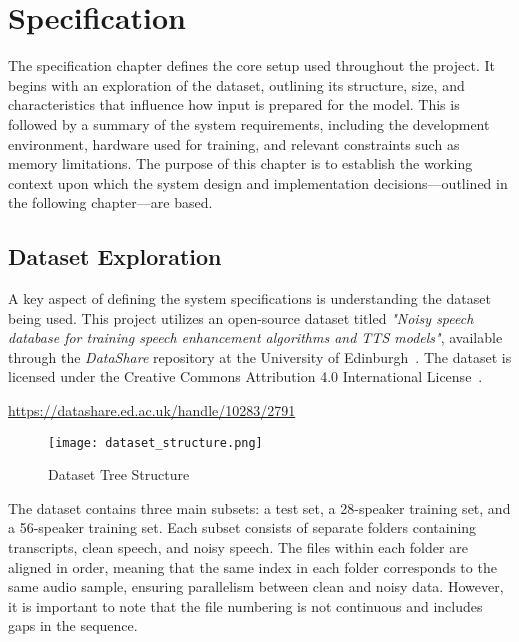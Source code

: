 \graphicspath{{content/chapters/4_specification/figures/}}
\chapter{Specification}
\label{chp:specification}

The specification chapter defines the core setup used throughout the project. It begins with an exploration of the dataset, outlining its structure, size, and characteristics that influence how input is prepared for the model. This is followed by a summary of the system requirements, including the development environment, hardware used for training, and relevant constraints such as memory limitations. The purpose of this chapter is to establish the working context upon which the system design and implementation decisions—outlined in the following chapter—are based.

\section{Dataset Exploration}
\label{sec:dataset_exploration}

A key aspect of defining the system specifications is understanding the dataset being used. This project utilizes an open-source dataset titled \textit{"Noisy speech database for training speech enhancement algorithms and TTS models"}, available through the \textit{DataShare} repository at the University of Edinburgh~\cite{edinburghdataset}. The dataset is licensed under the Creative Commons Attribution 4.0 International License~\cite{ccby4}.

\url{https://datashare.ed.ac.uk/handle/10283/2791}

\begin{figure}[H]
    \centering
    \texttt{[image: dataset\_structure.png]}
    \caption{Dataset Tree Structure}
    \label{fig:dataset_structure}
\end{figure}

The dataset contains three main subsets: a test set, a 28-speaker training set, and a 56-speaker training set. Each subset consists of separate folders containing transcripts, clean speech, and noisy speech. The files within each folder are aligned in order, meaning that the same index in each folder corresponds to the same audio sample, ensuring parallelism between clean and noisy data. However, it is important to note that the file numbering is not continuous and includes gaps in the sequence.

